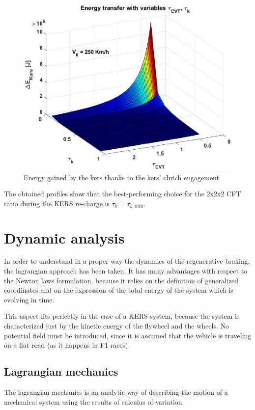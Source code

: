 \documentclass[11pt]{article}
\begin{document}
\begin{figure}[H]
\captionsetup{font=small, justification=centering}
\centering
\includegraphics[width=.7\textwidth]{Images/Results_new/Univariate_SteadyState/en_comp_dec_3D.eps}
\caption{Energy gained by the kers thanks to the kers' clutch engagement}
\label{en_comp_dec_3D}
\end{figure}  

The obtained profiles show that the best-performing choice for the 2x2x2 CFT ratio during the KERS re-charge  is $\tau_k=\tau_{k,min}$.

\section{Dynamic analysis}

In order to understand in a proper way the dynamics of the regenerative braking, the lagrangian approach has been taken. It has many advantages with respect to the Newton laws formulation, because it relies on the definition of generalized coordinates and on the expression of the total energy of the system which is evolving in time. 

This aspect fits perfectly in the case of a KERS system, because the system is characterized just by the kinetic energy of the flywheel and the wheels. No potential field must be introduced, since it is assumed that the vehicle is traveling on a flat road (as it happens in F1 races).

\subsection{Lagrangian mechanics}

The lagrangian mechanics is an analytic way of describing the motion of a mechanical system using the results of calculus of variation. 
\end{document}

